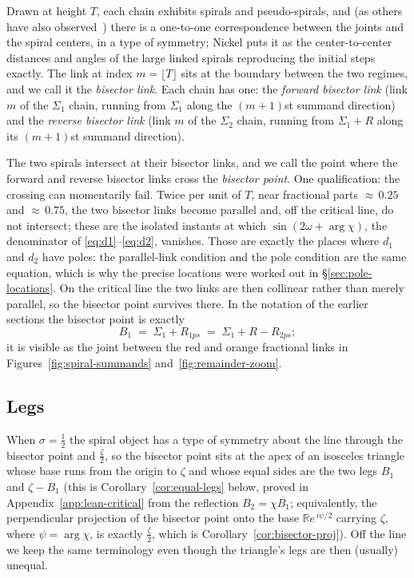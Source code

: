 \documentclass[11pt]{article}
\theoremstyle{definition}
\begin{document}
Drawn at height $T$, each chain exhibits spirals and pseudo-spirals, and (as
others have also observed~\cite{Erickson2005,Nickel2013,Kapitonets2019}) there is a one-to-one correspondence between the
joints and the spiral centers, in a type of symmetry; Nickel puts it as the
center-to-center distances and angles of the large linked spirals reproducing
the initial steps exactly. The link
at index $m=\lfloor T\rfloor$ sits at the boundary between the two
regimes, and we call it the \emph{bisector link}. Each chain has one: the \emph{forward bisector link} (link $m$ of the
$\Sigma_1$ chain, running from $\Sigma_1$ along the $(m+1)$st summand
direction) and the \emph{reverse bisector link} (link $m$ of the $\Sigma_2$
chain, running from $\Sigma_1+R$ along its $(m+1)$st summand direction).

The two spirals intersect at their bisector links, and we call the point where
the forward and reverse bisector links cross the \emph{bisector point}. One
qualification: the crossing can momentarily fail. Twice per unit of $T$, near
fractional parts ${\approx}\,0.25$ and ${\approx}\,0.75$, the two bisector
links become parallel and, off the critical line, do not intersect; these are
the isolated instants at which $\sin(2\omega+\arg\chi)$, the denominator of
\eqref{eq:d1}--\eqref{eq:d2}, vanishes. Those are exactly the places where
$d_1$ and $d_2$ have poles: the parallel-link condition and the pole
condition are the same equation, which is why the precise locations were
worked out in \S\ref{sec:pole-locations}. On the critical line the two links are then collinear rather than
merely parallel, so the bisector point survives there.
In the notation of the earlier sections the bisector point is exactly
\begin{equation}\label{eq:bisector-point}
B_1 \;=\; \Sigma_1 + R_{1ps} \;=\; \Sigma_1 + R - R_{2ps};
\end{equation}
it is visible as the joint between the red and orange fractional
links in Figures~\ref{fig:spiral-summands} and~\ref{fig:remainder-zoom}.

\subsection{Legs}\label{sec:legs}

When $\sigma=\tfrac12$ the spiral object
has a type of symmetry about the line through the bisector point and
$\tfrac{\zeta}{2}$, so the bisector point sits at the apex of an isosceles
triangle whose base runs from the origin to $\zeta$ and whose equal sides are
the two legs $B_1$ and $\zeta-B_1$ (this is Corollary~\ref{cor:equal-legs}
below, proved in Appendix~\ref{app:lean-critical} from the reflection
$B_2=\chi\overline{B_1}$; equivalently, the perpendicular projection of the
bisector point onto the base $\mathbb{R}e^{\,i\psi/2}$ carrying $\zeta$, where
$\psi=\arg\chi$, is exactly $\tfrac{\zeta}{2}$, which is
Corollary~\ref{cor:bisector-proj}). Off the line we keep the same
terminology even though the triangle's legs are then (usually) unequal.
\end{document}
